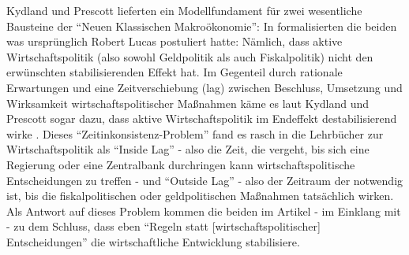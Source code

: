 Kydland und Prescott lieferten ein Modellfundament für zwei wesentliche Bausteine der "`Neuen Klassischen Makroökonomie"': In \textcite{Kydland1977} formalisierten die beiden was ursprünglich Robert Lucas postuliert hatte: Nämlich, dass aktive Wirtschaftspolitik (also sowohl Geldpolitik als auch Fiskalpolitik) nicht den erwünschten stabilisierenden Effekt hat. Im Gegenteil durch rationale Erwartungen und eine Zeitverschiebung (lag) zwischen Beschluss, Umsetzung und Wirksamkeit wirtschaftspolitischer Maßnahmen käme es laut Kydland und Prescott sogar dazu, dass aktive Wirtschaftspolitik im Endeffekt destabilisierend wirke \parencite[S. 486]{Kydland1977}. Dieses "`Zeitinkonsistenz-Problem"' fand es rasch in die Lehrbücher zur Wirtschaftspolitik als "`Inside Lag"' - also die Zeit, die vergeht, bis sich eine Regierung oder eine Zentralbank durchringen kann wirtschaftspolitische Entscheidungen zu treffen - und "`Outside Lag"' - also der Zeitraum der notwendig ist, bis die fiskalpolitischen oder geldpolitischen Maßnahmen tatsächlich wirken. Als Antwort auf dieses Problem kommen die beiden im Artikel - im Einklang mit \textcite{Lucas1976} - zu dem Schluss, dass eben "`Regeln statt [wirtschaftspolitischer] Entscheidungen"' die wirtschaftliche Entwicklung stabilisiere.


